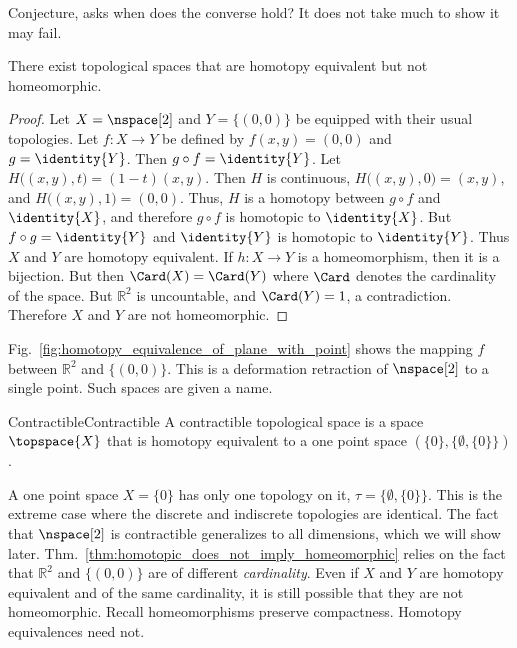         Conjecture, asks when does the converse hold?
        It does not take much to show it may fail.
        \begin{theorem}
            \label{thm:homotopic_does_not_imply_homeomorphic}%
            There exist topological spaces that are homotopy equivalent
            but not homeomorphic.
        \end{theorem}
        \begin{proof}
            Let $X=\nspace[2]$ and $Y=\{(0,0)\}$ be equipped with their
            usual topologies. Let $f:X\rightarrow{Y}$ be defined by
            $f(x,y)=(0,0)$ and $g=\identity{Y}$. Then
            $g\circ{f}=\identity{Y}$. Let
            $H\big((x,y),t\big)=(1-t)(x,y)$. Then $H$ is continuous,
            $H\big((x,y),0\big)=(x,y)$, and $H\big((x,y),1\big)=(0,0)$.
            Thus, $H$ is a homotopy between ${g}\circ{f}$ and
            $\identity{X}$, and therefore ${g}\circ{f}$ is homotopic to
            $\identity{X}$. But ${f}\circ{g}=\identity{Y}$ and
            $\identity{Y}$ is homotopic to $\identity{Y}$. Thus $X$ and
            $Y$ are homotopy equivalent. If $h:{X}\rightarrow{Y}$ is a
            homeomorphism, then it is a bijection. But then
            $\Card(X)=\Card(Y)$ where $\Card$ denotes the cardinality
            of the space. But $\mathbb{R}^{2}$ is uncountable, and
            $\Card(Y)=1$, a contradiction. Therefore $X$ and $Y$ are not
            homeomorphic.
        \end{proof}
        Fig.~\ref{fig:homotopy_equivalence_of_plane_with_point}
        shows the mapping $f$ between $\mathbb{R}^{2}$ and $\{(0,0)\}$.
        This is a deformation retraction of $\nspace[2]$ to a single
        point. Such spaces are given a name.
        \begin{fdefinition}{Contractible}{Contractible}
            A contractible topological space is a space $\topspace{X}$
            that is homotopy equivalent to a one point space
            $(\{0\},\{\emptyset,\{0\}\})$.
        \end{fdefinition}
        \par
        \begin{minipage}{0.54\textwidth}
            A one point space $X=\{0\}$ has only one topology on it,
            $\tau=\{\emptyset,\{0\}\}$. This is the extreme case where
            the discrete and indiscrete topologies are identical. The
            fact that $\nspace[2]$ is contractible generalizes to all
            dimensions, which we will show later.
            Thm.~\ref{thm:homotopic_does_not_imply_homeomorphic} relies
            on the fact that $\mathbb{R}^{2}$ and $\{(0,0)\}$ are of
            different \textit{cardinality}. Even if $X$ and $Y$ are
            homotopy equivalent and of the same cardinality, it is still
            possible that they are not homeomorphic. Recall
            homeomorphisms preserve compactness. Homotopy equivalences
            need not.
        \end{minipage}

